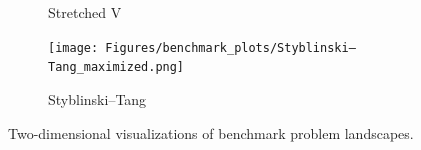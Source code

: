 \begin{figure}[p]
\begin{subfigure}{0.32\textwidth}
        \caption{Stretched V}
    \end{subfigure}
        \begin{subfigure}{0.32\textwidth}
        \centering
        \texttt{[image: Figures/benchmark\_plots/Styblinski–Tang\_maximized.png]}
        \caption{Styblinski–Tang}
    \end{subfigure}
        \captionsetup{list=no}
\caption{Two-dimensional visualizations of benchmark problem landscapes.}
\label{fig:benchmark_problems_plot}
\end{figure}